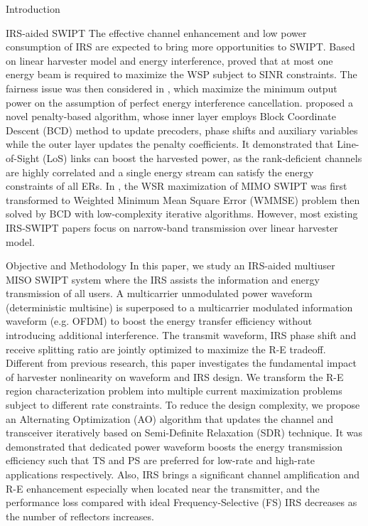 \documentclass{IEEEtran}
\begin{document}
\begin{section}{Introduction}
	\begin{subsection}{IRS-aided SWIPT}
		The effective channel enhancement and low power consumption of IRS are expected to bring more opportunities to SWIPT. Based on linear harvester model and energy interference, \cite{Wu2019b} proved that at most one energy beam is required to maximize the WSP subject to SINR constraints. The fairness issue was then considered in \cite{Tang2019}, which maximize the minimum output power on the assumption of perfect energy interference cancellation. \cite{Wu2019c} proposed a novel penalty-based algorithm, whose inner layer employs Block Coordinate Descent (BCD) method to update precoders, phase shifts and auxiliary variables while the outer layer updates the penalty coefficients. It demonstrated that Line-of-Sight (LoS) links can boost the harvested power, as the rank-deficient channels are highly correlated and a single energy stream can satisfy the energy constraints of all ERs. In \cite{Pan2019a}, the WSR maximization of MIMO SWIPT was first transformed to Weighted Minimum Mean Square Error (WMMSE) problem then solved by BCD with low-complexity iterative algorithms. However, most existing IRS-SWIPT papers focus on narrow-band transmission over linear harvester model.
	\end{subsection}

	\begin{subsection}{Objective and Methodology}
		In this paper, we study an IRS-aided multiuser MISO SWIPT system where the IRS assists the information and energy transmission of all users. A multicarrier unmodulated power waveform (deterministic multisine) is superposed to a multicarrier modulated information waveform (e.g. OFDM) to boost the energy transfer efficiency without introducing additional interference. The transmit waveform, IRS phase shift and receive splitting ratio are jointly optimized to maximize the R-E tradeoff. Different from previous research, this paper investigates the fundamental impact of harvester nonlinearity on waveform and IRS design. We transform the R-E region characterization problem into multiple current maximization problems subject to different rate constraints. To reduce the design complexity, we	propose an Alternating Optimization (AO) algorithm that updates the channel and transceiver iteratively based on Semi-Definite Relaxation (SDR) technique. It was demonstrated that dedicated power waveform boosts the energy transmission efficiency such that TS and PS are preferred for low-rate and high-rate applications respectively. Also, IRS brings a significant channel amplification and R-E enhancement especially when located near the transmitter, and the performance loss compared with ideal Frequency-Selective (FS) IRS decreases as the number of reflectors increases.
	\end{subsection}
\end{section}
\end{document}
